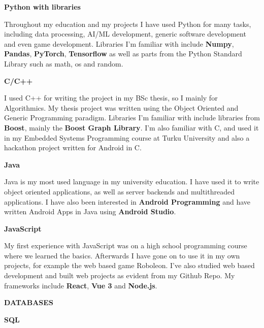 \documentclass{article}
\begin{document}
\textbf{\large Python with libraries}
\vspace{0.5cm}

\noindent Throughout my education and my projects I have used Python for many 
tasks, including data processing, AI/ML development, generic software 
development and even game development. Libraries I'm familiar with include 
\textbf{Numpy}, \textbf{Pandas}, \textbf{PyTorch}, \textbf{Tensorflow} as 
well as parts from the Python Standard Library such as math, os and random.

\vspace{0.5cm}
\textbf{\large C/C++}
\vspace{0.5cm}

\noindent I used C++ for writing the project in my BSc thesis, so I mainly for 
Algorithmics. My thesis project was written using the Object Oriented and 
Generic Programming paradigm. Libraries I'm familiar with include libraries 
from \textbf{Boost}, mainly the \textbf{Boost Graph Library}. I'm also 
familiar with C, and used it in my Embedded Systems Programming course at 
Turku University and also a hackathon project written for Android in C.

\vspace{0.5cm}
\textbf{\large Java}
\vspace{0.5cm}

\noindent Java is my most used language in my university education. I have 
used it to write object oriented applications, as well as server backends and 
multithreaded applications. I have also been interested in \textbf{Android 
Programming} and have written Android Apps in Java using \textbf{Android 
Studio}.

\vspace{0.5cm}
\textbf{\large JavaScript}
\vspace{0.5cm}

\noindent My first experience with JavaScript was on a high school programming 
course where we learned the basics. Afterwards I have gone on to use it in my 
own projects, for example the web based game Roboleon. I’ve also studied web 
based development and built web projects as evident from my Github Repo. My 
frameworks include \textbf{React}, \textbf{Vue 3} and \textbf{Node.js}.

\vspace{1cm}
\textbf{\LARGE DATABASES}
\vspace{0.5cm}

\textbf{\large SQL}
\vspace{0.5cm}
\end{document}
